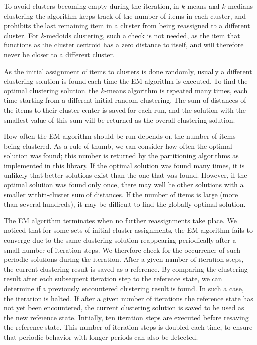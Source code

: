 \documentclass{report}
\begin{document}
To avoid clusters becoming empty during the iteration, in $k$-means and $k$-medians clustering the algorithm keeps track of the number of items in each cluster, and prohibits the last remaining item in a cluster from being reassigned to a different cluster. For $k$-medoids clustering, such a check is not needed, as the item that functions as the cluster centroid has a zero distance to itself, and will therefore never be closer to a different cluster.

As the initial assignment of items to clusters is done randomly, usually a different clustering solution is found each time the EM algorithm is executed.
To find the optimal clustering solution, the $k$-means algorithm is repeated many times, each time starting from a different initial random clustering. The sum of distances of the items to their cluster center is saved for each run, and the solution with the smallest value of this sum will be returned as the overall clustering solution.

How often the EM algorithm should be run depends on the number of items being clustered. As a rule of thumb, we can consider how often the optimal solution was found; this number is returned by the partitioning algorithms as implemented in this library. If the optimal solution was found many times, it is unlikely that better solutions exist than the one that was found. However, if the optimal solution was found only once, there may well be other solutions with a smaller within-cluster sum of distances. If the number of items is large (more than several hundreds), it may be difficult to find the globally optimal solution.

The EM algorithm terminates when no further reassignments take place.  We noticed that for some sets of initial cluster assignments, the EM algorithm fails to converge due to the same clustering solution reappearing periodically after a small number of iteration steps.  We therefore check for the occurrence of such periodic solutions during the iteration. After a given number of iteration steps, the current clustering result is saved as a reference. By comparing the clustering result after each subsequent iteration step to the reference state, we can determine if a previously encountered clustering result is found. In such a case, the iteration is halted. If after a given number of iterations the reference state has not yet been encountered, the current clustering solution is saved to be used as the new reference state. Initially, ten iteration steps are executed before resaving the reference state. This number of iteration steps is doubled each time, to ensure that periodic behavior with longer periods can also be detected.
\end{document}

